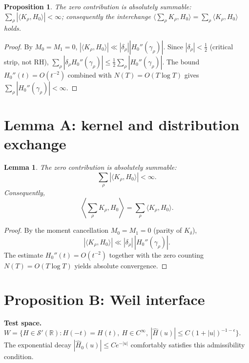 \documentclass[11pt]{article}
\newtheorem{lemma}[theorem]{Lemma}
\newtheorem{proposition}[theorem]{Proposition}
\begin{document}
\begin{proposition}\label{prop:a3}
The zero contribution is absolutely summable:
$\sum_\rho |\langle K_\rho,H_0\rangle|<\infty$; consequently the
interchange $\langle\sum_\rho K_\rho,H_0\rangle=\sum_\rho\langle
K_\rho,H_0\rangle$ holds.
\end{proposition}

\begin{proof}
By $M_0=M_1=0$, $|\langle K_\rho,H_0\rangle|\ll|\delta_\rho|
|H_0''(\gamma_\rho)|$.  Since $|\delta_\rho|<\tfrac12$ (critical strip,
not RH), $\sum_\rho|\delta_\rho H_0''(\gamma_\rho)|\le
\tfrac12\sum_\rho|H_0''(\gamma_\rho)|$.  The bound $H_0''(t)=O(t^{-2})$
combined with $N(T)=O(T\log T)$ gives $\sum_\rho|H_0''(\gamma_\rho)|
<\infty$.
\end{proof}

\section{Lemma A: kernel and distribution exchange}

\begin{lemma}\label{lem:exchange}
The zero contribution is absolutely summable:
\begin{equation}
\sum_\rho |\langle K_\rho,H_0\rangle|<\infty.
\end{equation}
Consequently,
\begin{equation}
\left\langle \sum_\rho K_\rho,H_0\right\rangle
=
\sum_\rho \langle K_\rho,H_0\rangle.
\end{equation}
\end{lemma}

\begin{proof}
By the moment cancellation $M_0=M_1=0$ (parity of $K_\delta$),
\begin{equation}
|\langle K_\rho,H_0\rangle|
\ll
|\delta_\rho|\,|H_0''(\gamma_\rho)|.
\end{equation}
The estimate $H_0''(t)=O(t^{-2})$ together with the zero counting
$N(T)=O(T\log T)$ yields absolute convergence.
\end{proof}

\section{Proposition B: Weil interface}

\noindent\textbf{Test space.} $W=\{H\in\mathcal S'(\mathbb R):
H(-t)=H(t),\ H\in C^\infty,\ |\widehat H(u)|\le C(1+|u|)^{-1-\epsilon}\}$.
The exponential decay $|\widehat H_0(u)|\le C e^{-|u|}$ comfortably
satisfies this admissibility condition.
\end{document}
